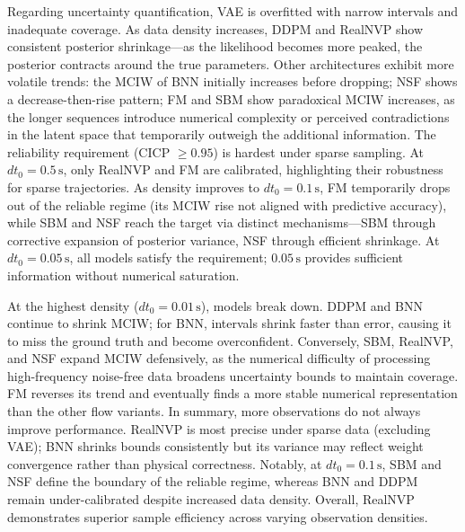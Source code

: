 Regarding uncertainty quantification, \ac{VAE} is overfitted with narrow intervals and inadequate coverage. As data density increases, \ac{DDPM} and \ac{RealNVP} show consistent posterior shrinkage---as the likelihood becomes more peaked, the posterior contracts around the true parameters. Other architectures exhibit more volatile trends: the MCIW of \ac{BNN} initially increases before dropping; \ac{NSF} shows a decrease-then-rise pattern; \ac{FM} and \ac{SBM} show paradoxical MCIW increases, as the longer sequences introduce numerical complexity or perceived contradictions in the latent space that temporarily outweigh the additional information. The reliability requirement (\ac{CICP} $\ge 0.95$) is hardest under sparse sampling. At $dt_0=0.5\,\mathrm{s}$, only \ac{RealNVP} and \ac{FM} are calibrated, highlighting their robustness for sparse trajectories. As density improves to $dt_0=0.1\,\mathrm{s}$, \ac{FM} temporarily drops out of the reliable regime (its MCIW rise not aligned with predictive accuracy), while \ac{SBM} and \ac{NSF} reach the target via distinct mechanisms---\ac{SBM} through corrective expansion of posterior variance, \ac{NSF} through efficient shrinkage. At $dt_0=0.05\,\mathrm{s}$, all models satisfy the requirement; $0.05\,\mathrm{s}$ provides sufficient information without numerical saturation.

At the highest density ($dt_0=0.01\,\mathrm{s}$), models break down. \ac{DDPM} and \ac{BNN} continue to shrink MCIW; for \ac{BNN}, intervals shrink faster than error, causing it to miss the ground truth and become overconfident. Conversely, \ac{SBM}, \ac{RealNVP}, and \ac{NSF} expand MCIW defensively, as the numerical difficulty of processing high-frequency noise-free data broadens uncertainty bounds to maintain coverage. \ac{FM} reverses its trend and eventually finds a more stable numerical representation than the other flow variants. In summary, more observations do not always improve performance. \ac{RealNVP} is most precise under sparse data (excluding \ac{VAE}); \ac{BNN} shrinks bounds consistently but its variance may reflect weight convergence rather than physical correctness. Notably, at $dt_0=0.1\,\mathrm{s}$, \ac{SBM} and \ac{NSF} define the boundary of the reliable regime, whereas \ac{BNN} and \ac{DDPM} remain under-calibrated despite increased data density. Overall, \ac{RealNVP} demonstrates superior sample efficiency across varying observation densities.

